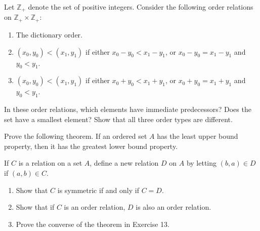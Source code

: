   \begin{exercise}[Munkres 3.12]
    Let $\mathbb{Z}_+$ denote the set of positive integers. Consider the following order relations on $\mathbb{Z}_+ \times \mathbb{Z}_+$:
    \begin{enumerate}
      \item The dictionary order.
      \item $(x_0, y_0) < (x_1, y_1)$ if either $x_0 - y_0 < x_1 - y_1$, or $x_0 - y_0 = x_1 - y_1$ and $y_0 < y_1$.
      \item $(x_0, y_0) < (x_1, y_1)$ if either $x_0 + y_0 < x_1 + y_1$, or $x_0 + y_0 = x_1 + y_1$ and $y_0 < y_1$.
    \end{enumerate}
    In these order relations, which elements have immediate predecessors? Does the set have a smallest element? Show that all three order types are different.
  \end{exercise}
  \begin{solution}
    
  \end{solution}

  \begin{exercise}[Munkres 3.13]
    Prove the following theorem. If an ordered set $A$ has the least upper bound property, then it has the greatest lower bound property.
  \end{exercise}
  \begin{solution}
    
  \end{solution}

  \begin{exercise}[Munkres 3.14]
    If $C$ is a relation on a set $A$, define a new relation $D$ on $A$ by letting $(b, a) \in D$ if $(a, b) \in C$.
    \begin{enumerate}
      \item Show that $C$ is symmetric if and only if $C = D$.
      \item Show that if $C$ is an order relation, $D$ is also an order relation.
      \item Prove the converse of the theorem in Exercise 13.
    \end{enumerate}
  \end{exercise}
  \begin{solution}
    
  \end{solution}

